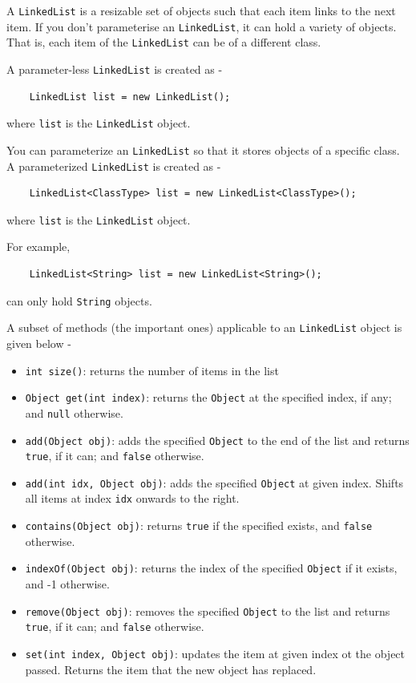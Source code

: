 \begin{questions}
\begin{enumerate}
\end{enumerate}

\question
A \texttt{LinkedList} is a resizable set of objects such that each item links to the next item. If you don't parameterise an \texttt{LinkedList}, it can hold a variety of objects. That is, each item of the \texttt{LinkedList} can be of a different class.

A parameter-less \texttt{LinkedList} is created as -

\begin{lstlisting}
    LinkedList list = new LinkedList();
\end{lstlisting}
where \texttt{list} is the \texttt{LinkedList} object.

You can parameterize an \texttt{LinkedList} so that it stores objects of a specific class. A parameterized \texttt{LinkedList} is created as -

\begin{lstlisting}
    LinkedList<ClassType> list = new LinkedList<ClassType>();
\end{lstlisting}

where \texttt{list} is the \texttt{LinkedList} object.

\newpage

For example,

\begin{lstlisting}
    LinkedList<String> list = new LinkedList<String>();
\end{lstlisting}

can only hold \texttt{String} objects.

A subset of methods (the important ones) applicable to an \texttt{LinkedList} object is given below -

\begin{itemize}
\item \texttt{int size()}: returns the number of items in the list
\item \texttt{Object get(int index)}: returns the \texttt{Object} at the specified index, if any; and \texttt{null} otherwise.
\item \texttt{add(Object obj)}: adds the specified \texttt{Object} to the end of the list and returns \texttt{true}, if it can; and \texttt{false} otherwise.
\item \texttt{add(int idx, Object obj)}: adds the specified \texttt{Object} at given index. Shifts all items at index \texttt{idx} onwards to the right.
\item \texttt{contains(Object obj)}: returns \texttt{true} if the specified exists, and \texttt{false} otherwise.
\item \texttt{indexOf(Object obj)}: returns the index of the specified \texttt{Object} if it exists, and -1 otherwise.
\item \texttt{remove(Object obj)}: removes the specified \texttt{Object} to the list and returns \texttt{true}, if it can; and \texttt{false} otherwise.
\item \texttt{set(int index, Object obj)}: updates the item at given index ot the object passed. Returns the item that the new object has replaced.
\end{itemize}


\end{questions}
